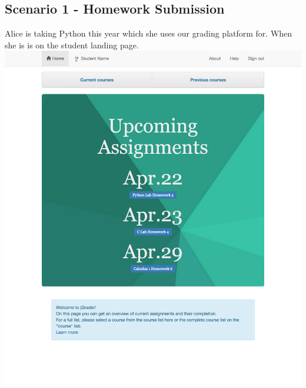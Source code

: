\subsection{Scenario 1 - Homework Submission}

Alice is taking Python this year which she uses our grading platform for. When she is is on the student landing page.\\
\includegraphics[width=.85\textwidth]{screenshots/StudentLandingPage.png}\\

